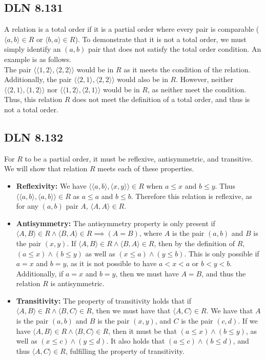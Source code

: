 \documentclass[titlepage]{article}
\begin{document}
\subsection{DLN 8.131}

A relation is a total order if it is a partial order where every pair is comparable ($\langle a,b \rangle \in R$ or $\langle b,a \rangle \in R$). To demonstrate that it is not a total order, we must simply identify an $(a,b)$ pair that does not satisfy the total order condition. An example is as follows.\\
The pair $\langle \langle 1,2 \rangle , \langle 2,2 \rangle \rangle$ would be in $R$ as it meets the condition of the relation. Additionally, the pair $\langle \langle 2,1 \rangle , \langle 2,2 \rangle \rangle$ would also be in $R$. However, neither $\langle \langle 2,1 \rangle , \langle 1,2 \rangle \rangle$ nor $\langle \langle 1,2 \rangle , \langle 2,1 \rangle \rangle$ would be in $R$, as neither meet the condition. Thus, this relation $R$ does not meet the definition of a total order, and thus is not a total order.

\subsection{DLN 8.132}

For $R$ to be a partial order, it must be reflexive, antisymmetric, and transitive. We will show that relation $R$ meets each of these properties.

\begin{itemize}
\item \textbf{Reflexivity:} We have $\langle \langle a,b \rangle , \langle x,y \rangle \rangle \in R$ when $a \leq x$ and $b \leq y$. Thus $\langle \langle a,b \rangle , \langle a,b \rangle \rangle \in R$ as $a \leq a$ and $b \leq b$. Therefore this relation is reflexive, as for any $(a,b)$ pair $A$, $\langle A,A \rangle \in R$.
\item \textbf{Antisymmetry:} The antisymmetry property is only present if $\langle A,B \rangle \in R \land \langle B,A \rangle \in R \implies (A=B)$, where $A$ is the pair $(a,b)$ and $B$ is the pair $(x,y)$. If $\langle A,B \rangle \in R \land \langle B,A \rangle \in R$, then by the definition of $R$, $(a \leq x) \land (b \leq y)$ as well as $(x \leq a) \land (y \leq b)$. This is only possible if $a=x$ and $b=y$, as it is not possible to have $a < x < a$ or $b < y < b$. Additionally, if $a=x$ and $b=y$, then we must have $A=B$, and thus the relation $R$ is antisymmetric.
\item \textbf{Transitivity:} The property of transitivity holds that if $\langle A,B \rangle \in R \land \langle B,C \rangle \in R$, then we must have that $\langle A,C \rangle \in R$. We have that $A$ is the pair $(a,b)$ and $B$ is the pair $(x,y)$, and $C$ is the pair $(c,d)$. If we have $\langle A,B \rangle \in R \land \langle B,C \rangle \in R$, then it must be that $(a \leq x) \land (b \leq y)$, as well as $(x \leq c) \land (y \leq d)$. It also holds that $(a \leq c) \land (b \leq d)$, and thus $\langle A,C \rangle \in R$, fulfilling the property of transitivity.
\end{itemize}
\end{document}
